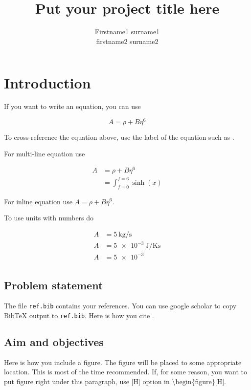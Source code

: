 \documentclass{template}
\title{Put your project title here}
\author{Firstname1 surname1\\ firstname2 surname2}
\begin{document}
\chapter{Introduction}

If you want to write an equation, you can use

\begin{equation}\label{eq:A}
A = \rho + B\eta^6
\end{equation}

To cross-reference the equation above, use the label of the equation such as .

For multi-line equation use

\begin{equation}
\begin{aligned}
A &= \rho + B\eta^6\\
  &= \int_{f=0}^{f=6} \sinh(x)
\end{aligned}
\end{equation}

For inline equation use $A = \rho + B\eta^6$.

To use units with numbers do

\begin{equation}
\begin{aligned}
A &= \SI{5}{\kg\per\s}\\
A &= \SI{5e-3}{\joule\per\kelvin\s}\\
A &= \num{5e-3}\\
\end{aligned}
\end{equation}


\section{Problem statement}

The file \texttt{ref.bib} contains your references. You can use google scholar to copy BibTeX output to \texttt{ref.bib}. Here is how you cite \cite{gulawani2006cfd}.

\section{Aim and objectives}

Here is how you include a figure. The figure will be placed to some appropriate location. This is most of the time recommended. If, for some reason, you want to put figure right under this paragraph, use [H] option in \textbackslash begin\{figure\}[H].
\end{document}
